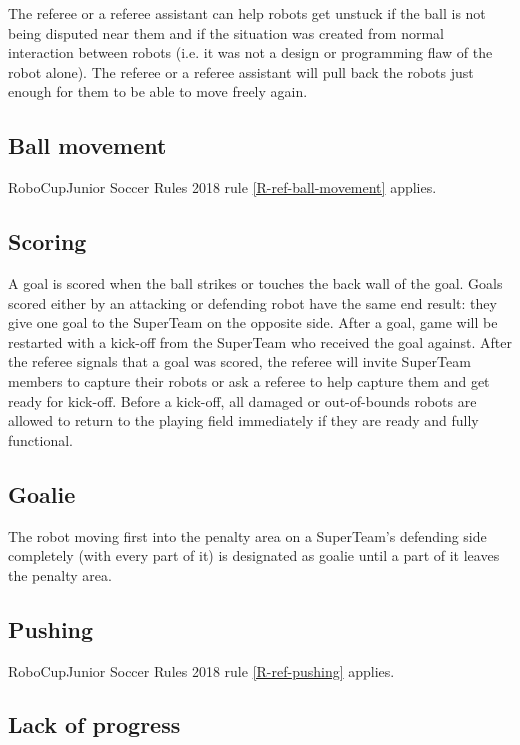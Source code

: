 \documentclass{article}
\begin{document}
The referee or a referee assistant can help robots get unstuck if the ball
is not being disputed near them and if the situation was created from normal
interaction between robots (i.e. it was not a design or programming flaw of
the robot alone). The referee or a referee assistant will pull back the robots
just enough for them to be able to move freely again.

\subsection{Ball movement \label{ref-006}}

RoboCupJunior Soccer Rules 2018 rule \ref{R-ref-ball-movement} applies.

\subsection{Scoring \label{ref-007}}

A goal is scored when the ball strikes or touches the back wall of the goal.
Goals scored either by an attacking or defending robot have the same end
result: they give one goal to the SuperTeam on the opposite side. After a goal,
game will be restarted with a kick-off from the SuperTeam who received the goal
against. After the referee signals that a goal was scored, the referee will
invite SuperTeam members to capture their robots or ask a referee to help
capture them and get ready for kick-off. Before a kick-off, all damaged or
out-of-bounds robots are allowed to return to the playing field immediately if
they are ready and fully functional.

\subsection{Goalie \label{ref-008}}

The robot moving first into the penalty area on a SuperTeam's defending side
completely (with every part of it) is designated as goalie until a part of it
leaves the penalty area.

\subsection{Pushing \label{ref-009}}

RoboCupJunior Soccer Rules 2018 rule \ref{R-ref-pushing} applies.

\subsection{Lack of progress \label{ref-010}}
\end{document}
